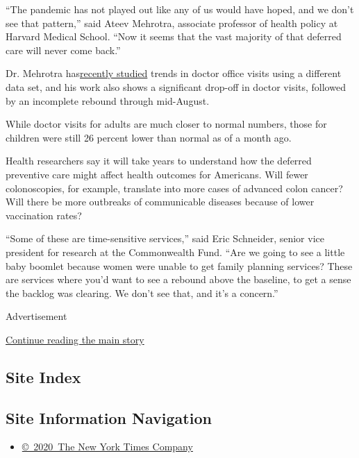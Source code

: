 ``The pandemic has not played out like any of us would have hoped, and
we don't see that pattern,'' said Ateev Mehrotra, associate professor of
health policy at Harvard Medical School. ``Now it seems that the vast
majority of that deferred care will never come back.''

Dr. Mehrotra
has\href{https://www.commonwealthfund.org/publications/2020/aug/impact-covid-19-pandemic-outpatient-visits-changing-patterns-care-newest}{recently
studied} trends in doctor office visits using a different data set, and
his work also shows a significant drop-off in doctor visits, followed by
an incomplete rebound through mid-August.

While doctor visits for adults are much closer to normal numbers, those
for children were still 26 percent lower than normal as of a month ago.

Health researchers say it will take years to understand how the deferred
preventive care might affect health outcomes for Americans. Will fewer
colonoscopies, for example, translate into more cases of advanced colon
cancer? Will there be more outbreaks of communicable diseases because of
lower vaccination rates?

``Some of these are time-sensitive services,'' said Eric Schneider,
senior vice president for research at the Commonwealth Fund. ``Are we
going to see a little baby boomlet because women were unable to get
family planning services? These are services where you'd want to see a
rebound above the baseline, to get a sense the backlog was clearing. We
don't see that, and it's a concern.''

Advertisement

\protect\hyperlink{after-bottom}{Continue reading the main story}

\hypertarget{site-index}{%
\subsection{Site Index}\label{site-index}}

\hypertarget{site-information-navigation}{%
\subsection{Site Information
Navigation}\label{site-information-navigation}}

\begin{itemize}
\tightlist
\item
  \href{https://help.nytimes3xbfgragh.onion/hc/en-us/articles/115014792127-Copyright-notice}{©~2020~The
  New York Times Company}
\end{itemize}

